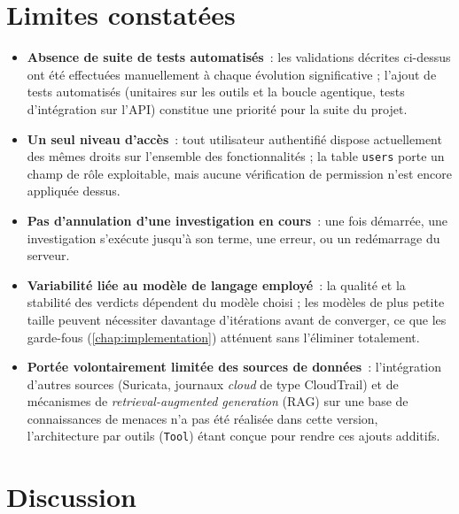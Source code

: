 \section{Limites constatées}
\label{sec:limites}

\begin{itemize}
  \item \textbf{Absence de suite de tests automatisés}~: les validations
        décrites ci-dessus ont été effectuées manuellement à chaque
        évolution significative ; l'ajout de tests automatisés
        (unitaires sur les outils et la boucle agentique, tests
        d'intégration sur l'API) constitue une priorité pour la suite du
        projet.
  \item \textbf{Un seul niveau d'accès}~: tout utilisateur authentifié
        dispose actuellement des mêmes droits sur l'ensemble des
        fonctionnalités ; la table \texttt{users} porte un champ de rôle
        exploitable, mais aucune vérification de permission n'est encore
        appliquée dessus.
  \item \textbf{Pas d'annulation d'une investigation en cours}~: une fois
        démarrée, une investigation s'exécute jusqu'à son terme, une
        erreur, ou un redémarrage du serveur.
  \item \textbf{Variabilité liée au modèle de langage employé}~: la
        qualité et la stabilité des verdicts dépendent du modèle choisi ;
        les modèles de plus petite taille peuvent nécessiter davantage
        d'itérations avant de converger, ce que les garde-fous
        (\cref{chap:implementation}) atténuent sans l'éliminer totalement.
  \item \textbf{Portée volontairement limitée des sources de données}~:
        l'intégration d'autres sources (Suricata, journaux \textit{cloud}
        de type CloudTrail) et de mécanismes de \textit{retrieval-augmented
        generation} (RAG) sur une base de connaissances de menaces n'a pas
        été réalisée dans cette version, l'architecture par outils
        (\texttt{Tool}) étant conçue pour rendre ces ajouts additifs.
\end{itemize}

\section{Discussion}


